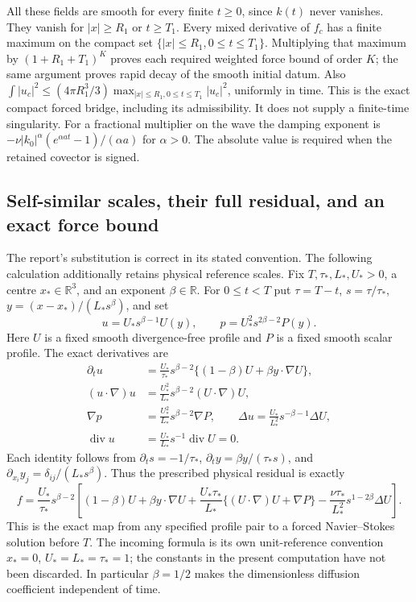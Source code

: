 All these fields are smooth for every finite $t\geq0$, since $k(t)$
never vanishes. They vanish for $|x|\geq R_1$ or $t\geq T_1$.
Every mixed derivative of $f_c$ has a finite maximum on the compact
set $\{|x|\leq R_1,0\leq t\leq T_1\}$. Multiplying that maximum
by $(1+R_1+T_1)^K$ proves each required weighted force bound of
order $K$; the same argument proves rapid decay of the smooth initial
datum. Also $\int|u_c|^2\leq(4\pi R_1^3/3)
\max_{|x|\leq R_1,0\leq t\leq T_1}|u_c|^2$, uniformly in time.
This is the exact compact forced bridge, including its admissibility.
It does not supply a finite-time singularity. For a fractional multiplier
on the wave the damping exponent is
$-\nu|k_0|^\alpha(e^{\alpha at}-1)/(\alpha a)$ for $\alpha>0$.
The absolute value is required when the retained covector is signed.

\subsection{Self-similar scales, their full residual, and an exact force bound}

The report's substitution is correct in its stated convention. The following
calculation additionally retains physical reference scales. Fix
$T,\tau_*,L_*,U_*>0$, a centre $x_*\in\mathbb R^3$, and an exponent
$\beta\in\mathbb R$. For $0\leq t<T$ put
$\tau=T-t$, $s=\tau/\tau_*$, $y=(x-x_*)/(L_*s^\beta)$, and set
\[
 u=U_*s^{\beta-1}U(y),\qquad
 p=U_*^2s^{2\beta-2}P(y).
\]
Here $U$ is a fixed smooth divergence-free profile and $P$ is a fixed
smooth scalar profile. The exact derivatives are
\begin{align*}
 \partial_tu&=\frac{U_*}{\tau_*}s^{\beta-2}
              \{(1-\beta)U+\beta y\cdot\nabla U\},\\
 (u\cdot\nabla)u&=\frac{U_*^2}{L_*}s^{\beta-2}(U\cdot\nabla)U,\\
 \nabla p&=\frac{U_*^2}{L_*}s^{\beta-2}\nabla P,\qquad
 \Delta u=\frac{U_*}{L_*^2}s^{-\beta-1}\Delta U,\\
 \operatorname{div}u&=\frac{U_*}{L_*}s^{-1}\operatorname{div}U=0.
\end{align*}
Each identity follows from $\partial_ts=-1/\tau_*$,
$\partial_ty=\beta y/(\tau_*s)$, and
$\partial_{x_i}y_j=\delta_{ij}/(L_*s^\beta)$.
Thus the prescribed physical residual is exactly
\begin{equation}
 f=\frac{U_*}{\tau_*}s^{\beta-2}
 \left[(1-\beta)U+\beta y\cdot\nabla U
 +\frac{U_*\tau_*}{L_*}\{(U\cdot\nabla)U+\nabla P\}
 -\frac{\nu\tau_*}{L_*^2}s^{1-2\beta}\Delta U\right].
 \label{eq:wb-selfsimilar-force}
\end{equation}
This is the exact map from any specified profile pair to a forced
Navier--Stokes solution before $T$. The incoming formula is its own
unit-reference convention $x_*=0$, $U_*=L_*=\tau_*=1$; the constants
in the present computation have not been discarded. In particular
$\beta=1/2$ makes the dimensionless diffusion coefficient independent
of time.

